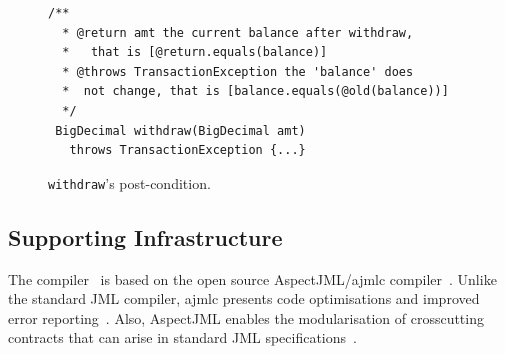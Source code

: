 \begin{figure}
\centering
\begin{lstlisting}[basicstyle=\footnotesize\ttfamily,name=figxpi, frame=lines, mathescape=true]
 /**
  * @return amt the current balance after withdraw,
  *   that is [@return.equals(balance)]
  * @throws TransactionException the 'balance' does
  *  not change, that is [balance.equals(@old(balance))]
  */
 BigDecimal withdraw(BigDecimal amt) 
   throws TransactionException {...}
\end{lstlisting}
\caption{\texttt{withdraw}'s post-condition.}
\label{fig:post-example}
\end{figure}



\subsection{Supporting Infrastructure}

The \contractjdoc{} compiler~\cite{contractjdoc-Compiler} is based on the open source AspectJML/ajmlc compiler~\cite{aspectjml,ajmlc,Rebelo-etal08}.
Unlike the standard JML compiler, ajmlc presents code optimisations and improved error reporting~\cite{ajmlc}.
Also, AspectJML enables the modularisation
of crosscutting contracts that can arise in standard
JML specifications~\cite{aspectjml}.

